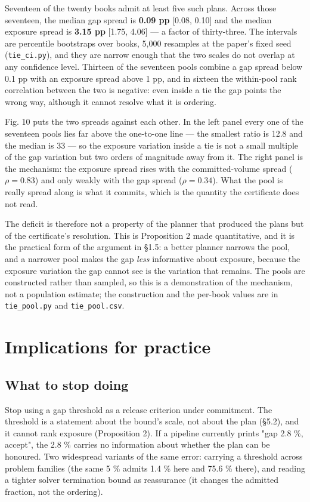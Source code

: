 \documentclass[preprint,12pt,letterpaper]{elsarticle}
\theoremstyle{definition}
\theoremstyle{plain}
\begin{document}
Seventeen of the twenty books admit at least five such plans. Across those seventeen, the median gap spread is \textbf{0.09 pp} [0.08, 0.10] and the median exposure spread is \textbf{3.15 pp} [1.75, 4.06] --- a factor of thirty-three. The intervals are percentile bootstraps over books, 5,000 resamples at the paper's fixed seed (\texttt{tie\_\allowbreak{}ci.\allowbreak{}py}), and they are narrow enough that the two scales do not overlap at any confidence level. Thirteen of the seventeen pools combine a gap spread below 0.1 pp with an exposure spread above 1 pp, and in sixteen the within-pool rank correlation between the two is negative: even inside a tie the gap points the wrong way, although it cannot resolve what it is ordering.

Fig. 10 puts the two spreads against each other. In the left panel every one of the seventeen pools lies far above the one-to-one line --- the smallest ratio is 12.8 and the median is 33 --- so the exposure variation inside a tie is not a small multiple of the gap variation but two orders of magnitude away from it. The right panel is the mechanism: the exposure spread rises with the committed-volume spread ($\rho = 0.83$) and only weakly with the gap spread ($\rho = 0.34$). What the pool is really spread along is what it commits, which is the quantity the certificate does not read.

The deficit is therefore not a property of the planner that produced the plans but of the certificate's resolution. This is Proposition 2 made quantitative, and it is the practical form of the argument in \S 1.5: a better planner narrows the pool, and a narrower pool makes the gap \textit{less} informative about exposure, because the exposure variation the gap cannot see is the variation that remains. The pools are constructed rather than sampled, so this is a demonstration of the mechanism, not a population estimate; the construction and the per-book values are in \texttt{tie\_\allowbreak{}pool.\allowbreak{}py} and \texttt{tie\_\allowbreak{}pool.\allowbreak{}csv}.

\section{Implications for practice}

\subsection{What to stop doing}

Stop using a gap threshold as a release criterion under commitment. The threshold is a statement about the bound's scale, not about the plan (\S 5.2), and it cannot rank exposure (Proposition 2). If a pipeline currently prints "gap 2.8 \%, accept", the 2.8 \% carries no information about whether the plan can be honoured. Two widespread variants of the same error: carrying a threshold across problem families (the same 5 \% admits 1.4 \% here and 75.6 \% there), and reading a tighter solver termination bound as reassurance (it changes the admitted fraction, not the ordering).
\end{document}
